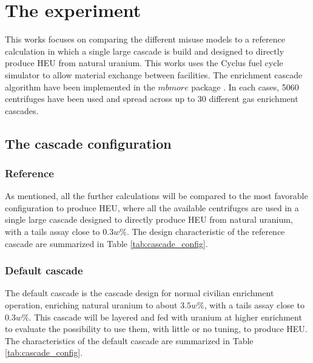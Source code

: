 \section{The experiment}
This works focuses on comparing the different misuse models to a reference
calculation in which a single large cascade is build and designed to directly
produce \gls{HEU} from natural uranium.
This works uses the Cyclus fuel cycle simulator to allow material exchange
between facilities. The enrichment cascade algorithm have been implemented in
the $mbmore$ package \cite{mbmore.2018}.
In each cases, 5060 centrifuges have been used and spread across up to 30
different gas enrichment cascades. 


\subsection{The cascade configuration}

\subsubsection{Reference}

As mentioned, all the further calculations will be compared to the most
favorable configuration to produce \gls{HEU}, where all the available
centrifuges are used in a single large cascade designed to directly produce
\gls{HEU} from natural uranium, with a tails assay close to $0.3w\%$. The design
characteristic of the reference cascade are summarized in Table
\ref{tab:cascade_config}.

\subsubsection{Default cascade}

The default cascade is the cascade design for normal civilian enrichment
operation, enriching natural uranium to about $3.5w\%$, with a tails assay close
to $0.3w\%$. This cascade will be layered and fed with uranium at higher
enrichment to evaluate the possibility to use them, with little or no tuning, to
produce \gls{HEU}. The characteristics of the default cascade are summarized in
Table \ref{tab:cascade_config}.


